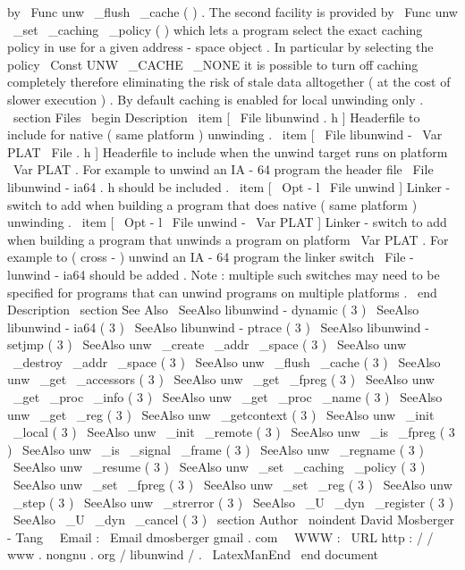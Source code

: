 by
\
Func
{
unw
\
_flush
\
_cache
}
(
)
.
The
second
facility
is
provided
by
\
Func
{
unw
\
_set
\
_caching
\
_policy
}
(
)
which
lets
a
program
select
the
exact
caching
policy
in
use
for
a
given
address
-
space
object
.
In
particular
by
selecting
the
policy
\
Const
{
UNW
\
_CACHE
\
_NONE
}
it
is
possible
to
turn
off
caching
completely
therefore
eliminating
the
risk
of
stale
data
alltogether
(
at
the
cost
of
slower
execution
)
.
By
default
caching
is
enabled
for
local
unwinding
only
.
\
section
{
Files
}
\
begin
{
Description
}
\
item
[
\
File
{
libunwind
.
h
}
]
Headerfile
to
include
for
native
(
same
platform
)
unwinding
.
\
item
[
\
File
{
libunwind
-
}
\
Var
{
PLAT
}
\
File
{
.
h
}
]
Headerfile
to
include
when
the
unwind
target
runs
on
platform
\
Var
{
PLAT
}
.
For
example
to
unwind
an
IA
-
64
program
the
header
file
\
File
{
libunwind
-
ia64
.
h
}
should
be
included
.
\
item
[
\
Opt
{
-
l
}
\
File
{
unwind
}
]
Linker
-
switch
to
add
when
building
a
program
that
does
native
(
same
platform
)
unwinding
.
\
item
[
\
Opt
{
-
l
}
\
File
{
unwind
-
}
\
Var
{
PLAT
}
]
Linker
-
switch
to
add
when
building
a
program
that
unwinds
a
program
on
platform
\
Var
{
PLAT
}
.
For
example
to
(
cross
-
)
unwind
an
IA
-
64
program
the
linker
switch
\
File
{
-
lunwind
-
ia64
}
should
be
added
.
Note
:
multiple
such
switches
may
need
to
be
specified
for
programs
that
can
unwind
programs
on
multiple
platforms
.
\
end
{
Description
}
\
section
{
See
Also
}
\
SeeAlso
{
libunwind
-
dynamic
(
3
)
}
\
SeeAlso
{
libunwind
-
ia64
(
3
)
}
\
SeeAlso
{
libunwind
-
ptrace
(
3
)
}
\
SeeAlso
{
libunwind
-
setjmp
(
3
)
}
\
SeeAlso
{
unw
\
_create
\
_addr
\
_space
(
3
)
}
\
SeeAlso
{
unw
\
_destroy
\
_addr
\
_space
(
3
)
}
\
SeeAlso
{
unw
\
_flush
\
_cache
(
3
)
}
\
SeeAlso
{
unw
\
_get
\
_accessors
(
3
)
}
\
SeeAlso
{
unw
\
_get
\
_fpreg
(
3
)
}
\
SeeAlso
{
unw
\
_get
\
_proc
\
_info
(
3
)
}
\
SeeAlso
{
unw
\
_get
\
_proc
\
_name
(
3
)
}
\
SeeAlso
{
unw
\
_get
\
_reg
(
3
)
}
\
SeeAlso
{
unw
\
_getcontext
(
3
)
}
\
SeeAlso
{
unw
\
_init
\
_local
(
3
)
}
\
SeeAlso
{
unw
\
_init
\
_remote
(
3
)
}
\
SeeAlso
{
unw
\
_is
\
_fpreg
(
3
)
}
\
SeeAlso
{
unw
\
_is
\
_signal
\
_frame
(
3
)
}
\
SeeAlso
{
unw
\
_regname
(
3
)
}
\
SeeAlso
{
unw
\
_resume
(
3
)
}
\
SeeAlso
{
unw
\
_set
\
_caching
\
_policy
(
3
)
}
\
SeeAlso
{
unw
\
_set
\
_fpreg
(
3
)
}
\
SeeAlso
{
unw
\
_set
\
_reg
(
3
)
}
\
SeeAlso
{
unw
\
_step
(
3
)
}
\
SeeAlso
{
unw
\
_strerror
(
3
)
}
\
SeeAlso
{
\
_U
\
_dyn
\
_register
(
3
)
}
\
SeeAlso
{
\
_U
\
_dyn
\
_cancel
(
3
)
}
\
section
{
Author
}
\
noindent
David
Mosberger
-
Tang
\
\
Email
:
\
Email
{
dmosberger
gmail
.
com
}
\
\
WWW
:
\
URL
{
http
:
/
/
www
.
nongnu
.
org
/
libunwind
/
}
.
\
LatexManEnd
\
end
{
document
}
